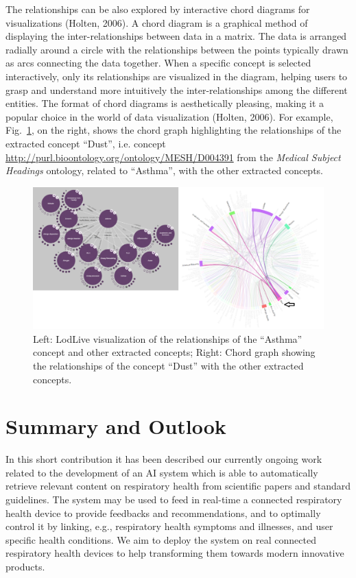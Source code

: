 \documentclass[runningheads,a4paper]{llncs}
\makeatletter
\def\maxwidth#1{\ifdim\Gin@nat@width>#1 #1\else\Gin@nat@width\fi}
\makeatother
\begin{document}
The relationships can be also explored by interactive chord diagrams for visualizations (Holten, 2006). A chord diagram is a graphical method of displaying the inter-relationships between data in a matrix. The data is arranged radially around a circle with the relationships between the points typically drawn as arcs connecting the data together. When a specific concept is selected interactively, only its relationships are visualized in the diagram, helping users to grasp and understand more intuitively the inter-relationships among the different entities. The format of chord diagrams is aesthetically pleasing, making it a popular choice in the world of data visualization (Holten, 2006). For example, Fig.~\ref{_Ref490605006}, on the right, shows the chord graph highlighting the relationships of the extracted concept ``Dust'', i.e. concept \url{http://purl.bioontology.org/ontology/MESH/D004391} from the {\em Medical Subject Headings }ontology, related to ``Asthma'', with the other extracted concepts.
\begin{figure}[h!]
\centering
\includegraphics[width=\maxwidth{\textwidth}]{./img/image2.png}
\cprotect\caption{  Left: LodLive visualization of the relationships of the ``Asthma'' concept and other extracted concepts; Right: Chord graph showing the relationships of the concept ``Dust'' with the other extracted concepts.}
\label{_Ref490605006}
\end{figure}


\section{Summary and Outlook}

In this short contribution it has been described our currently ongoing work related to the development of an AI system which is able to automatically retrieve relevant content on respiratory health from scientific papers and standard guidelines. The system may be used to feed in real-time a connected respiratory health device to provide feedbacks and recommendations, and to optimally control it by linking, e.g., respiratory health symptoms and illnesses, and user specific health conditions. We aim to deploy the system on real connected respiratory health devices to help transforming them towards modern innovative products. 
\end{document}
